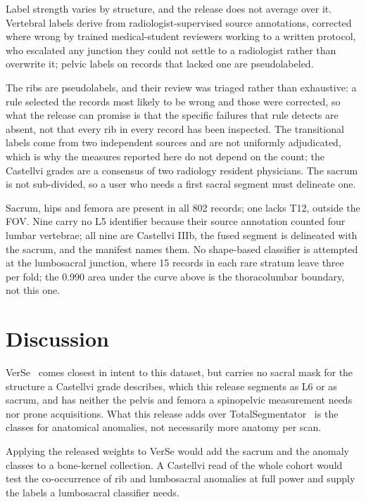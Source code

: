 \documentclass[aapm,mph,amsmath,amssymb,preprint,linenumbers]{revtex4-2}
\begin{document}
Label strength varies by structure, and the release does not average over it. Vertebral
labels derive from radiologist-supervised source annotations, corrected where wrong by trained
medical-student reviewers working to a written protocol, who escalated any junction they could
not settle to a radiologist rather than overwrite it; pelvic labels on records that lacked one
are pseudolabeled.

The ribs are pseudolabels, and their review was triaged rather than exhaustive: a rule
selected the records most likely to be wrong and those were corrected, so what the release
can promise is that the specific failures that rule detects are absent, not that every rib
in every record has been inspected. The transitional labels come from two independent
sources and are not uniformly adjudicated, which is why the measures reported here do not
depend on the count; the Castellvi grades are a consensus of two radiology resident
physicians. The sacrum is not sub-divided, so a user who needs a first sacral segment must
delineate one.

Sacrum, hips and femora are present in all 802 records; one lacks T12, outside the FOV. Nine
carry no L5 identifier because their source annotation counted four lumbar vertebrae; all nine
are Castellvi IIIb, the fused segment is delineated with the sacrum, and the manifest names
them. No shape-based classifier is attempted at the lumbosacral junction, where 15 records in
each rare stratum leave three per fold; the 0.990 area under the curve above is the
thoracolumbar boundary, not this one.

\section{Discussion}

VerSe~\cite{verse2021,versedata2021} comes closest in intent to this dataset, but carries no
sacral mask for the structure a Castellvi grade describes, which this release segments as L6
or as sacrum, and has neither the pelvis and femora a spinopelvic measurement needs nor prone
acquisitions. What this release adds
over TotalSegmentator~\cite{totalsegmentator,neurips2026lstv} is the classes for anatomical anomalies, not necessarily more
anatomy per scan.

Applying the released weights to VerSe would add the sacrum and the
anomaly classes to a bone-kernel collection. A Castellvi read of the whole cohort
would test the co-occurrence of rib and lumbosacral anomalies at full power and supply the
labels a lumbosacral classifier needs.
\end{document}
